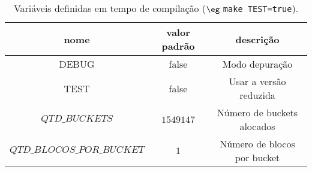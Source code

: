 \begin{table}[!htbp]
  \centering
    \begin{tabular}{|c|c|c|}
    \toprule
    \rowcolor[rgb]{ .816,  .808,  .808} \textbf{nome} & \textbf{valor padrão} & \textbf{descrição} \\
    \midrule
    DEBUG & false & Modo depuração \\
    \midrule
    TEST & false & Usar a versão reduzida \\
    \midrule
    $QTD\_BUCKETS$ & $1549147$ & Número de buckets alocados \\
    \midrule
    $QTD\_BLOCOS\_POR\_BUCKET$ & $1$ & Número de blocos por bucket \\
    \bottomrule
    \end{tabular}%
  \caption{Variáveis definidas em tempo de compilação ($\eg$ \texttt{make TEST=true}).}
  \label{tab:macros_make}%
\end{table}%